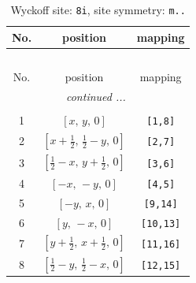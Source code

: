 \documentclass[fleqn,8pt]{jsarticle}
\begin{document}
\renewcommand{\arraystretch}{1.2}
\begin{longtable}{ccc}
\caption{Wyckoff site: {\tt 8i}, site symmetry: {\tt m..}}
 \\
 \hline \hline
No. & position & mapping \\ \hline \endfirsthead

\multicolumn{2}{l}{\tablename\ \thetable{}} \\
 \hline \hline
No. & position & mapping \\ \hline \endhead

 \hline \hline
\multicolumn{2}{r}{\footnotesize\it continued ...} \\ \endfoot

 \hline \hline
\multicolumn{2}{r}{} \\ \endlastfoot

1 & $\left[ x,\, y,\, 0 \right]$ & {\tt [1,8]} \\ \hline
2 & $\left[ x + \frac{1}{2},\, \frac{1}{2} - y,\, 0 \right]$ & {\tt [2,7]} \\ \hline
3 & $\left[ \frac{1}{2} - x,\, y + \frac{1}{2},\, 0 \right]$ & {\tt [3,6]} \\ \hline
4 & $\left[ - x,\, - y,\, 0 \right]$ & {\tt [4,5]} \\ \hline
5 & $\left[ - y,\, x,\, 0 \right]$ & {\tt [9,14]} \\ \hline
6 & $\left[ y,\, - x,\, 0 \right]$ & {\tt [10,13]} \\ \hline
7 & $\left[ y + \frac{1}{2},\, x + \frac{1}{2},\, 0 \right]$ & {\tt [11,16]} \\ \hline
8 & $\left[ \frac{1}{2} - y,\, \frac{1}{2} - x,\, 0 \right]$ & {\tt [12,15]} \\
\end{longtable}
\renewcommand{\arraystretch}{1.2}
\end{document}
